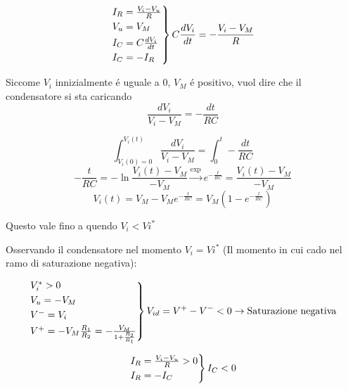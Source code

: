 \documentclass{article}
\begin{document}
\[
    \begin{rcases}
        I_R =\frac{V_i - V_u}{R}\\
        V_u = V_M\\
        I_C = C\frac{dV_i}{dt}\\
        I_C = - I_R
    \end{rcases}
    C \frac{dV_i}{dt} = - \frac{V_i - V_M}{R}
\]

Siccome $V_i$ innizialmente \'e uguale a 0, $V_M$ \'e positivo, vuol dire che il condensatore si sta caricando
\[
    \frac{dV_i}{V_i - V_M} = -\frac{dt}{RC}
\]

\[
    \int_{V_i(0) = 0}^{V_i(t)} \frac{dV_i}{V_i - V_M} = \int_0^t - \frac{dt}{RC}
\]
\[ -\frac{t}{RC} = -\ln\frac{V_i(t) - V_M}{-V_M}\xrightarrow{\exp} e^{-\frac{t}{RC}} = \frac{V_i(t) - V_M}{-V_M} \]
\[ V_i(t) = V_M - V_M e^{-\frac{t}{RC}} = V_M \left(1 - e^{-\frac{t}{RC}}\right) \]

Questo vale fino a quendo $V_i < Vi^*$

Osservando il condensatore nel momento $V_i = Vi^*$ (Il momento in cui cado nel ramo di saturazione negativa):

\[
    \begin{rcases}
        V_i^* > 0\\
        V_u = -V_M\\
        V^- = V_i\\
        V^+ = -V_M \frac{R_1}{R_2} = -\frac{V_M}{1 + \frac{R_2}{R_1}}\\
    \end{rcases}
        V_{id} = V^+ - V^- < 0 \rightarrow \text{Saturazione negativa}\\
    \]

\[
    \begin{rcases}
        I_R = \frac{V_i - V_u}{R} > 0\\
        I_R = -I_C
    \end{rcases} I_C < 0
\]

\end{document}
